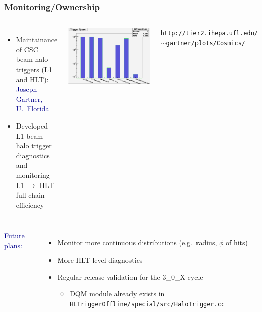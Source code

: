 \documentclass[compress]{beamer}
\begin{document}
\begin{frame}
\frametitle{Monitoring/Ownership}

\begin{columns}
\begin{itemize}
\item Maintainance of CSC beam-halo triggers (L1 and HLT): \\ \textcolor{darkblue}{Joseph Gartner, U.\ Florida}
\item Developed L1 beam-halo trigger diagnostics and monitoring \\ L1 $\to$ HLT full-chain efficiency
\end{itemize}

\vspace{0.65 cm}

\includegraphics[width=\linewidth]{TriggerOcc.png}

\textcolor{blue}{\mbox{\hspace{-1.4 cm}} \tt \tiny \href{http://tier2.ihepa.ufl.edu/~gartner/plots/Cosmics/}{http://tier2.ihepa.ufl.edu/$\sim$gartner/plots/Cosmics/}\mbox{\hspace{-2 cm}}}
\end{columns}

\vspace{-0.65 cm}
\begin{columns}
\textcolor{darkblue}{Future plans:}
\begin{itemize}
\item Monitor more continuous distributions (e.g.\ radius, $\phi$ of hits)
\item More HLT-level diagnostics
\item Regular release validation for the 3\_0\_X cycle
\begin{itemize}
\item DQM module already exists in {\tt \tiny HLTriggerOffline/special/src/HaloTrigger.cc}
\end{itemize}


\end{itemize}
\end{columns}
\end{frame}
\end{document}
